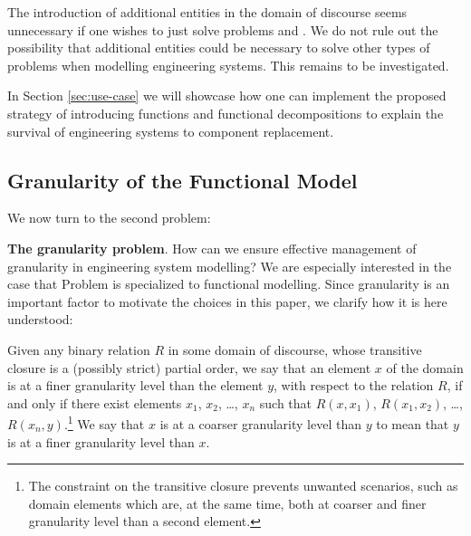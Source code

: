 \documentclass[
]{ceurart}
\begin{document}
The introduction of additional entities in the domain of discourse
seems unnecessary if one wishes to just solve problems  and . We do not rule out the possibility that additional entities could be necessary to solve other types of problems when modelling engineering systems. This remains to be investigated.

In Section \ref{sec:use-case} we will showcase how one can implement the proposed strategy of introducing functions and functional decompositions to explain the survival of engineering systems to component replacement.  

\subsection{Granularity of the Functional Model}
We now turn to the second problem:
\bflist
  \item[\mypb{granularity-problem}] \textbf{The granularity problem}. How can we ensure effective management of granularity in engineering system modelling?
\eflist
We are especially interested in the case that Problem  is specialized to functional modelling.
Since granularity is an important factor to motivate the choices in this paper, we clarify how it is here understood:
\bflist
\item[\mydf{granularity}]
    Given any binary relation $R$ in some domain of discourse, whose transitive closure is a (possibly strict) partial order, we say that an element $x$ of the domain is at a finer granularity level than the element $y$, with respect to the relation $R$, if and only if there exist elements $x_1$, $x_2$, \dots, $x_n$ such that $R(x,x_1)$, $R(x_1,x_2)$, \dots, $R(x_n,y)$.\footnote{The constraint on the transitive closure prevents unwanted scenarios, such as domain elements which are, at the same time, both at coarser and finer granularity level than a second element.} 
    We say that $x$ is at a coarser granularity level than $y$ to mean that $y$ is at a finer granularity level than $x$.
    
\end{document}
